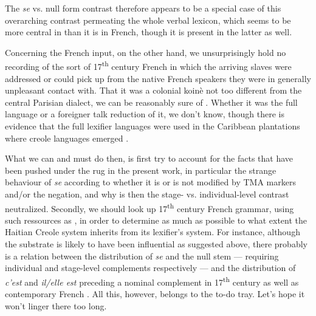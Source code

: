 \documentclass[output=paper]{langsci/langscibook}
\begin{document}
The \emph{se} vs. null form contrast therefore appears to be a special
case of this overarching contrast permeating the whole verbal lexicon,
which seems to be more central in  than it is in French, though it
is present in the latter as well.

Concerning the French input, on the other hand, we unsurprisingly hold
no recording of the sort of 17\textsuperscript{th} century French in
which the arriving slaves were addressed or could pick up from the
native French speakers they were in generally unpleasant contact with.
That it was a colonial koinè not too different from the central Parisian
dialect, we can be reasonably sure of %
\citep{Chaudenson2004}%
%
. Whether it was
the full language or a foreigner talk reduction of it, we don't know,
though there is evidence that the full lexifier languages were used in
the Caribbean plantations where creole languages emerged %
\citep{Alleyne1980}%
%
.

What we can and must do then, is first try to account for the facts that
have been pushed under the rug in the present work, in particular the
strange behaviour of \emph{se} according to whether it is or is not
modified by TMA markers and/or the negation, and why is then the stage-
vs. individual-level contrast neutralized. Secondly, we should look up
17\textsuperscript{th} century French grammar, using such ressources as
%
\citet{Haase1935a}%
%
, in order to determine as much as possible to what extent
the Haitian Creole system inherits from its lexifier's system. For
instance, although the substrate is likely to have been influential as
suggested above, there probably is a relation between the distribution
of \emph{se} and the null stem --- requiring individual and stage-level
complements respectively --- and the distribution of \emph{c'est} and
\emph{il/elle est} preceding a nominal complement in
17\textsuperscript{th} century as well as contemporary French %
\citep{Kupferman79,Boone1987,Zribi-Hertz18}%
%
. All this, however, belongs to
the to-do tray. Let's hope it won't linger there too long.
\end{document}
